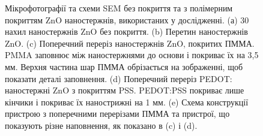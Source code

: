 \documentclass[a4paper,14pt]{extreport}
\begin{document}
\begin{figure}[h!]
\caption{\small{Мікрофотографії та схеми SEM без покриття та з полімерним покриттям ZnO
наностержнів, використаних у дослідженні. (а) 30 нахил наностержнів ZnO без покриття. (b) Перетин наностержнів ZnO. (c) Поперечний переріз наностержнів ZnO, покритих ПММА. PMMA заповнює між наностержнями до основи і покриває їх на 3,5 мм. Верхня частина
шар ПММА обрізається на зображенні, щоб показати деталі заповнення. (d) Поперечний переріз
PEDOT: наностержні ZnO з покриттям PSS. PEDOT:PSS покриває лише кінчики і покриває їх
нанострижні на 1 мм. (e) Схема конструкції пристрою з поперечними перерізами ПММА
та пристрої, що показують різне наповнення, як показано в (c) і (d).}}
\end{figure}
\end{document}
